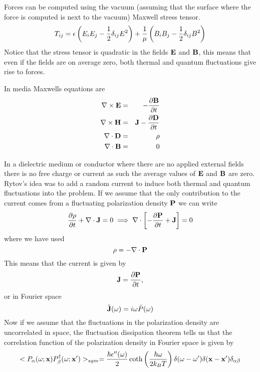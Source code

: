 Forces can be computed using the vacuum (assuming that the surface where the force is computed is next to the vacuum) Maxwell stress tensor.
\begin{equation}
    T_{ij}= \epsilon\left(E_iE_j -{1\over 2}\delta_{ij}E^2\right) + {1\over \mu}\left( B_i B_j -{1\over 2}\delta_{ij}B^2\right)
\end{equation}
Notice that the stress tensor is quadratic in the fields ${\bf E}$ and ${\bf B}$, this means that even if the fields are on average zero, both thermal and quantum fluctuations give rise to forces.

In media Maxwells equations are
\begin{eqnarray}
\nabla \times{\bf E} &=& -{\partial {\bf B}\over \partial t} \\
\nabla \times{\bf H} &=& {\bf J}-{\partial {\bf D}\over \partial t} \\
\nabla \cdot {\bf D} &=& \rho\\
\nabla \cdot {\bf B} &=& 0 
\end{eqnarray}

In a dielectric medium or conductor where there are no applied external fields there is no free charge or current as such the average values of ${\bf E}$ and ${\bf B}$ are zero. Rytov's idea was to add a random current to induce both thermal and quantum fluctuations
into the problem. If we assume that the only contribution to the current comes from a fluctuating polarization density ${\bf P}$ we can write
\begin{equation}
    {\partial \rho\over \partial t} +\nabla \cdot {\bf J}= 0\implies\nabla\cdot \left[-{\partial {\bf P}\over \partial t} +{\bf J}\right] = 0
\end{equation}
where we have used
\begin{equation}
    \rho = -\nabla \cdot {\bf P}
\end{equation}
This means that the current is given by
\begin{equation}
    {\bf J}={\partial {\bf P}\over \partial t} ,
\end{equation}
or in Fourier space
\begin{equation}
    \tilde {\bf J}(\omega)= i\omega \tilde P(\omega)
\end{equation}
Now if we assume that the fluctuations in the polarization density are uncorrelated in space, the fluctuation dissipation theorem tells us that the correlation function of the polarization density in Fourier space is given by
\begin{equation}
    < P_\alpha(\omega; {\bf x})P^{\dagger}_\beta(\omega; {\bf x}')>_{sym}=
    {\hbar \epsilon''(\omega)\over 2}\coth\left({\hbar\omega\over 2k_B T}\right)\delta(\omega-\omega')\delta({\bf x}-{\bf x}')\delta_{\alpha\beta}
\end{equation}

